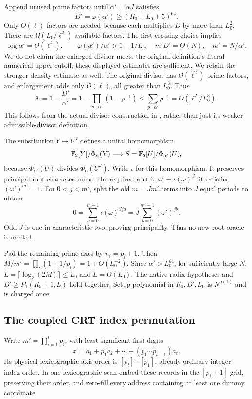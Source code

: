 Append unused prime factors until $\alpha'=\alpha J$ satisfies
\[
 D'=\varphi(\alpha')\ge(R_0+L_0+5)^{64}.
\]
Only $O(\ell)$ factors are needed because each multiplies $D$ by more
than $L_0^2$. There are $\Omega(L_0/\ell^2)$ available factors.
The first-crossing choice implies
\[
 \log\alpha'=O(\ell^4),\qquad
 \varphi(\alpha')/\alpha'>1-1/L_0,
 \quad m'D'=\Theta(N),\quad m'=N/\alpha'.
\]
We do not claim the enlarged divisor meets the original definition's
literal numerical upper cutoff; these displayed estimates are sufficient.
We retain the stronger density estimate as well. The original divisor
has $O(\ell^2)$ prime factors, and enlargement adds only $O(\ell)$,
all greater than $L_0^3$. Thus
\begin{equation}
 \label{eq:strong-density}
 \theta:=1-\frac{D'}{\alpha'}
   =1-\prod_{p\mid\alpha'}(1-p^{-1})
   \le\sum_{p\mid\alpha'}p^{-1}
   =O(\ell^2/L_0^3).
\end{equation}
This follows from the actual divisor construction in
\cite[Proposition 3.8, proof]{host}, rather than just its
weaker admissible-divisor definition.

The substitution $Y\mapsto U^J$ defines a unital homomorphism
\[
 \mathbb F_2[Y]/\Phi_\alpha(Y)\longrightarrow
 S=\mathbb F_2[U]/\Phi_{\alpha'}(U),
\]
because $\Phi_{\alpha'}(U)$ divides $\Phi_\alpha(U^J)$.
Write $\iota$ for this homomorphism. It preserves principal-root
character sums. The required root is
$\omega'=\iota(\omega)^J$: it satisfies $(\omega')^{m'}=1$.
For $0<j<m'$, split the old $m=Jm'$ terms into $J$ equal periods
to obtain
\[
 0=\sum_{a=0}^{m-1}\iota(\omega)^{Jja}
   =J\sum_{b=0}^{m'-1}(\omega')^{jb}.
\]
Odd $J$ is one in characteristic two, proving principality.
Thus no new root oracle is needed.

Pad the remaining prime axes by $n_i=p_i+1$. Then
$M/m'=\prod_i(1+1/p_i)=1+O(L_0^{-2})$.
Since $\alpha'>L_0^{64}$, for sufficiently large $N$,
$L=\lceil\log_2(2M)\rceil\le L_0$ and $L=\Theta(L_0)$.
The native radix hypotheses and $D'\ge P_1(R_0+1,L)$ hold together.
Setup polynomial in $R_0,D',L_0$ is $N^{o(1)}$ and is charged once.

\subsection{The coupled CRT index permutation}

Write $m'=\prod_{i=1}^t p_i$, with least-significant-first digits
\[
 x=a_1+p_1a_2+\cdots+(p_1\cdots p_{t-1})a_t.
\]
Its physical lexicographic axis order is $[p_t]\cdots[p_1]$, already
ordinary integer index order. In one lexicographic scan embed these
records in the $[p_i+1]$ grid, preserving their order, and zero-fill
every address containing at least one dummy coordinate.

